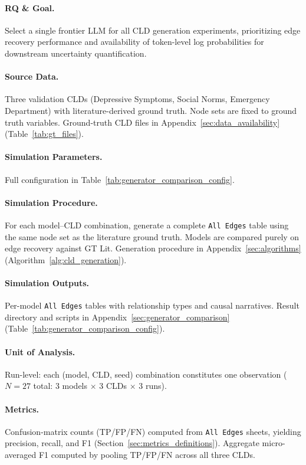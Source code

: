 \paragraph{RQ \& Goal.}
Select a single frontier LLM for all CLD generation experiments, prioritizing edge recovery performance and availability of token-level log probabilities for downstream uncertainty quantification.

\paragraph{Source Data.}
Three validation CLDs (Depressive Symptoms, Social Norms, Emergency Department) with literature-derived ground truth. Node sets are fixed to ground truth variables.
Ground-truth CLD files in Appendix~\ref{sec:data_availability} (Table~\ref{tab:gt_files}).

\paragraph{Simulation Parameters.}
Full configuration in Table~\ref{tab:generator_comparison_config}.

\paragraph{Simulation Procedure.}
For each model--CLD combination, generate a complete \texttt{All Edges} table using the same node set as the literature ground truth. Models are compared purely on edge recovery against GT Lit.
Generation procedure in Appendix~\ref{sec:algorithms} (Algorithm~\ref{alg:cld_generation}).

\paragraph{Simulation Outputs.}
Per-model \texttt{All Edges} tables with relationship types and causal narratives.
Result directory and scripts in Appendix~\ref{sec:generator_comparison} (Table~\ref{tab:generator_comparison_config}).

\paragraph{Unit of Analysis.}
Run-level: each (model, CLD, seed) combination constitutes one observation ($N=27$ total: 3 models $\times$ 3 CLDs $\times$ 3 runs).

\paragraph{Metrics.}
Confusion-matrix counts (TP/FP/FN) computed from \texttt{All Edges} sheets, yielding precision, recall, and F1 (Section~\ref{sec:metrics_definitions}). Aggregate micro-averaged F1 computed by pooling TP/FP/FN across all three CLDs.

